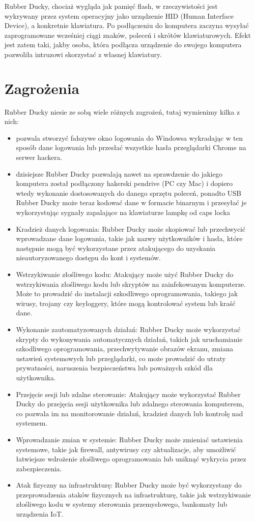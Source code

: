 \documentclass{article}
\begin{document}
Rubber Ducky, chociaż wygląda jak pamięć flash, w rzeczywistości jest wykrywany przez system operacyjny jako urządzenie HID (Human Interface Device), a konkretnie klawiatura. Po podłączeniu do komputera zaczyna wysyłać zaprogramowane wcześniej ciągi znaków, poleceń i skrótów klawiaturowych. Efekt jest zatem taki, jakby osoba, która podłącza urządzenie do swojego komputera pozwoliła intruzowi skorzystać z własnej klawiatury.

\section{Zagrożenia}

Rubber Ducky niesie ze sobą wiele różnych zagrożeń, tutaj wymienimy kilka z nich:
\begin{itemize}
    \item pozwala stworzyć fałszywe okno logowania do Windowsa wykradając w ten sposób dane logowania lub przesłać wszystkie hasła przeglądarki Chrome na serwer hackera. 
    \item dzisiejsze Rubber Ducky pozwalają nawet na sprawdzenie do jakiego komputera został podłączony hakerski pendrive (PC czy Mac) i dopiero wtedy wykonanie dostosowanych do danego sprzętu poleceń, ponadto USB Rubber Ducky może teraz kodować dane w formacie binarnym i przesyłać je wykorzystując sygnały zapalające na klawiaturze lampkę od caps locka
    \item Kradzież danych logowania: Rubber Ducky może skopiować lub przechwycić wprowadzane dane logowania, takie jak nazwy użytkowników i hasła, które następnie mogą być wykorzystane przez atakującego do uzyskania nieautoryzowanego dostępu do kont i systemów.
    \item Wstrzykiwanie złośliwego kodu: Atakujący może użyć Rubber Ducky do wstrzykiwania złośliwego kodu lub skryptów na zainfekowanym komputerze. Może to prowadzić do instalacji szkodliwego oprogramowania, takiego jak wirusy, trojany czy keyloggery, które mogą kontrolować system lub kraść dane.
    \item Wykonanie zautomatyzowanych działań: Rubber Ducky może wykorzystać skrypty do wykonywania automatycznych działań, takich jak uruchamianie szkodliwego oprogramowania, przechwytywanie obrazów ekranu, zmiana ustawień systemowych lub przeglądarki, co może prowadzić do utraty prywatności, naruszenia bezpieczeństwa lub poważnych szkód dla użytkownika.
    \item  Przejęcie sesji lub zdalne sterowanie: Atakujący może wykorzystać Rubber Ducky do przejęcia sesji użytkownika lub zdalnego sterowania komputerem, co pozwala im na monitorowanie działań, kradzież danych lub kontrolę nad systemem.
    \item Wprowadzanie zmian w systemie: Rubber Ducky może zmieniać ustawienia systemowe, takie jak firewall, antywirusy czy aktualizacje, aby umożliwić łatwiejsze wdrożenie złośliwego oprogramowania lub uniknąć wykrycia przez zabezpieczenia.
    \item  Atak fizyczny na infrastrukturę: Rubber Ducky może być wykorzystany do przeprowadzenia ataków fizycznych na infrastrukturę, takie jak wstrzykiwanie złośliwego kodu w systemy sterowania przemysłowego, bankomaty lub urządzenia IoT.


\end{itemize}
\end{document}
